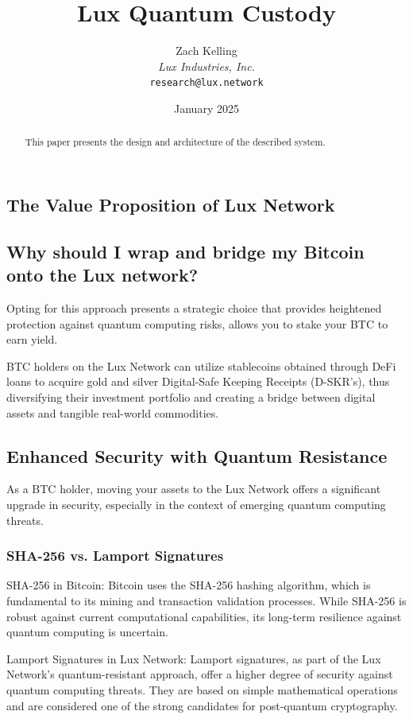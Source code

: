 \documentclass[11pt]{article}
\title{Lux Quantum Custody}
\author{Zach Kelling\\\textit{Lux Industries, Inc.}\\\texttt{research@lux.network}}
\date{January 2025}
\begin{document}
\luxcoverpage

\begin{abstract}
This paper presents the design and architecture of the described system.
\end{abstract}

\tableofcontents
\newpage


\subsection{The Value Proposition of Lux Network}

\subsection{Why should I wrap and bridge my Bitcoin onto the Lux network?}

Opting for this approach presents a strategic choice that provides heightened protection against quantum computing risks, allows you to stake your BTC to earn yield.


BTC holders on the Lux Network can utilize stablecoins obtained through DeFi loans to acquire gold and silver Digital-Safe Keeping Receipts (D-SKR's), thus diversifying their investment portfolio and creating a bridge between digital assets and tangible real-world commodities.


\subsection{Enhanced Security with Quantum Resistance}

As a BTC holder, moving your assets to the Lux Network offers a significant upgrade in security, especially in the context of emerging quantum computing threats.


\subsubsection{SHA-256 vs. Lamport Signatures}

SHA-256 in Bitcoin: Bitcoin uses the SHA-256 hashing algorithm, which is fundamental to its mining and transaction validation processes. While SHA-256 is robust against current computational capabilities, its long-term resilience against quantum computing is uncertain.


Lamport Signatures in Lux Network: Lamport signatures, as part of the Lux Network's quantum-resistant approach, offer a higher degree of security against quantum computing threats. They are based on simple mathematical operations and are considered one of the strong candidates for post-quantum cryptography.
\end{document}

